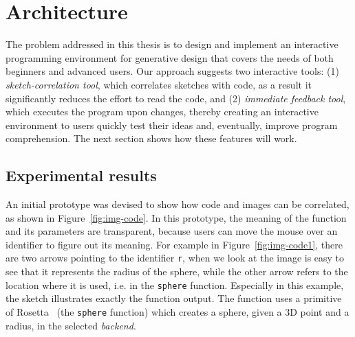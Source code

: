 
% 
% 

\section{Architecture}
\label{sec:arch}

The problem addressed in this thesis is to design and implement an interactive programming environment for generative design that covers the needs of both beginners and advanced users. Our approach suggests two interactive tools: (1) \textit{sketch-correlation tool}, which correlates sketches with code, as a result it significantly reduces the effort to read the code, and (2) \textit{immediate feedback tool}, which executes the program upon changes, thereby creating an interactive environment to users quickly test their ideas and, eventually, improve program comprehension. The next section shows how these features will work.

\subsection{Experimental results}

An initial prototype was devised to show how code and images can be correlated, as shown in Figure~\ref{fig:img-code}. In this prototype, the meaning of the function and its parameters are transparent, because users can move the mouse over an identifier to figure out its meaning. For example in Figure~\ref{fig:img-code1}, there are two arrows pointing to the identifier \texttt{r}, when we look at the image is easy to see that it represents the radius of the sphere, while the other arrow refers to the location where it is used, i.e. in the \texttt{sphere} function. Especially in this example, the sketch illustrates exactly the function output. The function uses a primitive of Rosetta~\cite{lopes2011portable} (the \texttt{sphere} function) which creates a sphere, given a 3D point and a radius, in the selected \textit{backend}.

